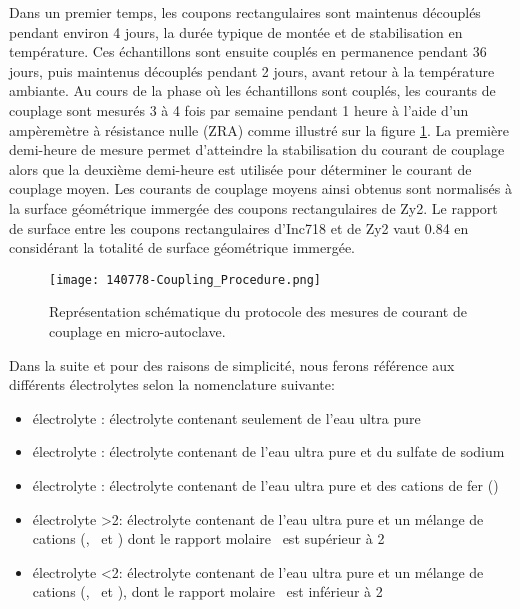 \begin{refsection}
    Dans un premier temps, les coupons rectangulaires sont maintenus découplés pendant environ 4 jours, la durée 
    typique de montée et de stabilisation en température. Ces échantillons sont ensuite couplés en permanence pendant 36
    jours, puis maintenus découplés pendant 2 jours, avant retour à la température ambiante. 
    Au cours de la phase où les échantillons sont couplés, les courants de couplage sont mesurés 3 à 4 fois par
    semaine pendant 1 heure à l’aide d’un ampèremètre à résistance nulle (ZRA) comme illustré sur la figure \ref{fig:ch4_coupling_procedure}. 
    La première demi-heure de mesure permet d’atteindre la stabilisation du courant de couplage alors que la deuxième 
    demi-heure est utilisée pour déterminer le courant de couplage moyen. Les courants de couplage moyens ainsi obtenus 
    sont normalisés à la surface géométrique immergée des coupons rectangulaires de Zy2. Le rapport de surface entre les
    coupons rectangulaires d’Inc718 et de Zy2 vaut 0.84 en considérant la totalité de surface géométrique immergée.   

    \begin{figure}[H]
        \centering
        \texttt{[image: 140778-Coupling\_Procedure.png]}
        \caption{Représentation schématique du protocole des mesures de courant de couplage en micro-autoclave.}
        \label{fig:ch4_coupling_procedure}
    \end{figure}

    
    Dans la suite et pour des raisons de simplicité, nous ferons référence aux différents électrolytes selon la nomenclature suivante:

    \begin{itemize}
        \item électrolyte \water: électrolyte contenant seulement de l’eau ultra pure 
	    \item électrolyte \NaSO: électrolyte contenant de l’eau ultra pure et du sulfate de sodium
	    \item électrolyte \FeII: électrolyte contenant de l’eau ultra pure et des cations de fer (\FeII) 
	    \item électrolyte \ratio >2: électrolyte contenant de l’eau ultra pure et un mélange de cations (\FeII, \NiII\
            et \ZnII) dont le rapport molaire \ratio\ est supérieur à 2
        \item électrolyte  \ratio <2: électrolyte contenant de l’eau ultra pure et un mélange de cations (\FeII, \NiII\ et
        \ZnII), dont le rapport molaire \ratio\ est inférieur à 2
    \end{itemize}



\end{refsection}
